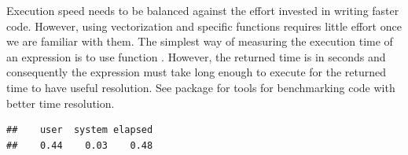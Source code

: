 \documentclass[krantz2]{krantz}\usepackage{knitr}
\begin{document}
Execution speed needs to be balanced against the effort invested in writing faster code. However, using vectorization and specific \Rlang functions requires little effort once we are familiar with them. The simplest way of measuring the execution time of an \Rlang expression is to use function . However, the returned time is in seconds and consequently the expression must take long enough to execute for the returned time to have useful resolution. See package  for tools for benchmarking code with better time resolution.

\begin{knitrout}\footnotesize
{}\color{fgcolor}\begin{kframe}
\begin{alltt}
 \hlkwb{<-} \hlstd{()}
               \hlopt{:}\hlstd{) \{}
               \hlkwb{<-}  \hlopt{/} 
              \hlstd{\}}
            \hlstd{\})}
\end{alltt}
\begin{verbatim}
##    user  system elapsed
##    0.44    0.03    0.48
\end{verbatim}
\end{kframe}
\end{knitrout}
\end{document}
